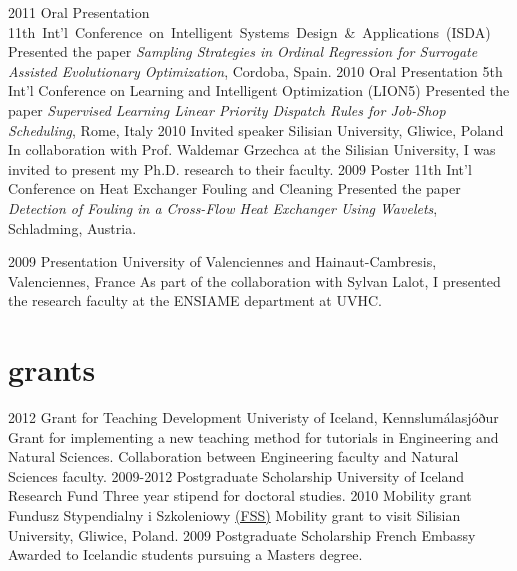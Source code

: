 \documentclass[]{cv} %
\begin{document}
\begin{entrylist}
\entry
{2011}
{Oral Presentation}
{\mbox{11th Int'l Conference on Intelligent Systems Design \& Applications (ISDA)}}
{Presented the paper  \emph{Sampling Strategies in Ordinal Regression for 
Surrogate Assisted Evolutionary Optimization}, Cordoba, Spain.}
\entry
{2010}
{Oral Presentation}
{5th Int'l Conference on Learning and Intelligent Optimization (LION5)}
{Presented the paper \emph{Supervised Learning Linear Priority Dispatch Rules 
for Job-Shop Scheduling}, Rome, Italy}
\entry
{2010}
{Invited speaker}
{Silisian University, Gliwice, Poland}
{In collaboration with Prof. Waldemar Grzechca at the Silisian University, I was invited to present my Ph.D. research to their faculty.}
\entry
{2009}
{Poster}
{11th Int'l Conference on Heat Exchanger Fouling and Cleaning }
{Presented the paper \emph{Detection of Fouling in a Cross-Flow Heat Exchanger Using Wavelets}, Schladming, Austria.}
\end{entrylist}
\begin{entrylist}
\entry
{2009}
{Presentation }
{University of Valenciennes and Hainaut-Cambresis, Valenciennes, France}
{As part of the collaboration with Sylvan Lalot, I presented the research faculty at the ENSIAME department at UVHC.}
\end{entrylist}
\section{grants}
\begin{entrylist}
    \entry
    {2012}
    {Grant for Teaching Development}
    {Univeristy of Iceland, Kennslumálasjóður}
    {Grant for implementing a new teaching method for tutorials in Engineering 
        and 
        Natural Sciences. Collaboration between Engineering faculty and Natural 
        Sciences faculty. }
    \entry
    {2009-2012}
    {Postgraduate Scholarship}
    {University of Iceland Research Fund}
    {Three year stipend for doctoral studies.}
    \entry
    {2010}
    {Mobility grant}
    {Fundusz Stypendialny i Szkoleniowy 
        \href{http://www.fss.org.pl/en/about}{(FSS)}} %
    {Mobility grant to visit Silisian University, Gliwice, Poland.}
    \entry
    {2009}
    {Postgraduate Scholarship}
    {French Embassy}
    {Awarded to Icelandic students pursuing a Masters degree.}
\end{entrylist}
\end{document}
